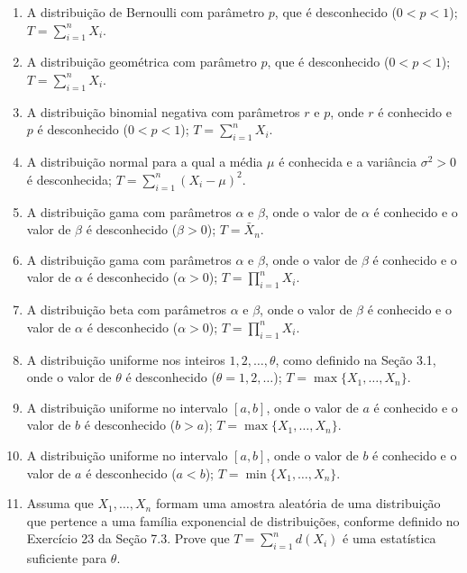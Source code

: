 \begin{enumerate}
    \item A distribuição de Bernoulli com parâmetro $p$, que é desconhecido ($0 < p < 1$); $T = \sum_{i=1}^{n} X_i$.

    \item A distribuição geométrica com parâmetro $p$, que é desconhecido ($0 < p < 1$); $T = \sum_{i=1}^{n} X_i$.

    \item A distribuição binomial negativa com parâmetros $r$ e $p$, onde $r$ é conhecido e $p$ é desconhecido ($0 < p < 1$); $T = \sum_{i=1}^{n} X_i$.

    \item A distribuição normal para a qual a média $\mu$ é conhecida e a variância $\sigma^2 > 0$ é desconhecida; $T = \sum_{i=1}^{n} (X_i - \mu)^2$.

    \item A distribuição gama com parâmetros $\alpha$ e $\beta$, onde o valor de $\alpha$ é conhecido e o valor de $\beta$ é desconhecido ($\beta > 0$); $T = \bar{X}_n$.

    \item A distribuição gama com parâmetros $\alpha$ e $\beta$, onde o valor de $\beta$ é conhecido e o valor de $\alpha$ é desconhecido ($\alpha > 0$); $T = \prod_{i=1}^{n} X_i$.

    \item A distribuição beta com parâmetros $\alpha$ e $\beta$, onde o valor de $\beta$ é conhecido e o valor de $\alpha$ é desconhecido ($\alpha > 0$); $T = \prod_{i=1}^{n} X_i$.
    
    \item A distribuição uniforme nos inteiros $1, 2, \dots, \theta$, como definido na Seção 3.1, onde o valor de $\theta$ é desconhecido ($\theta = 1, 2, \dots$); $T = \max\{X_1, \dots, X_n\}$.
    
    \item A distribuição uniforme no intervalo $[a, b]$, onde o valor de $a$ é conhecido e o valor de $b$ é desconhecido ($b > a$); $T = \max\{X_1, \dots, X_n\}$.

    \item A distribuição uniforme no intervalo $[a, b]$, onde o valor de $b$ é conhecido e o valor de $a$ é desconhecido ($a < b$); $T = \min\{X_1, \dots, X_n\}$.

    \item Assuma que $X_1, \dots, X_n$ formam uma amostra aleatória de uma distribuição que pertence a uma família exponencial de distribuições, conforme definido no Exercício 23 da Seção 7.3. Prove que $T = \sum_{i=1}^{n} d(X_i)$ é uma estatística suficiente para $\theta$.
    

\end{enumerate}
